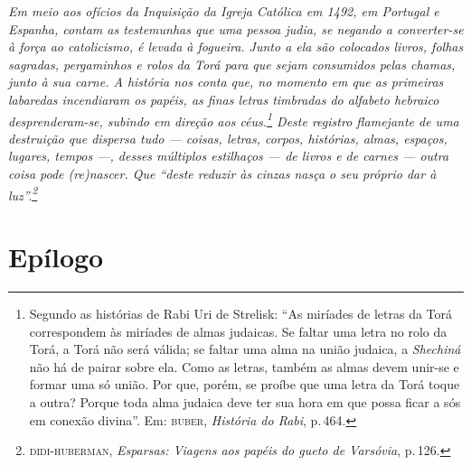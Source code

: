 \pagebreak

{
\thispagestyle{empty}

\mbox{}

\vspace{7.5cm}

\footnotesize
\noindent{}\emph{\noindent{}Em meio aos ofícios da Inquisição da Igreja Católica em 1492, em Portugal e Espanha, contam as testemunhas que uma pessoa judia, se negando a converter-se à força ao catolicismo, é levada à fogueira. Junto a ela são colocados livros, folhas sagradas, pergaminhos e rolos da Torá para que sejam consumidos pelas chamas, junto à sua carne. A história nos conta que, no momento em que as primeiras labaredas incendiaram os papéis, as finas letras timbradas do alfabeto hebraico desprenderam-se, subindo em direção aos céus.\footnote{Segundo as histórias de Rabi Uri de Strelisk: ``As miríades de letras da Torá correspondem às miríades de almas judaicas. Se faltar uma letra no rolo da Torá, a Torá não será válida; se faltar uma alma na união judaica, a \emph{Shechiná} não há de pairar sobre ela. Como as letras, também as almas devem unir-se e formar uma só união. Por que, porém, se proíbe que uma letra da Torá toque a outra? Porque toda alma judaica deve ter sua hora em que possa ficar a sós em conexão divina''. Em: \textsc{buber}, \emph{História do Rabi}, p.\,464.} Deste registro flamejante de uma destruição que dispersa tudo --- coisas, letras, corpos, histórias, almas, espaços, lugares, tempos ---, desses múltiplos estilhaços --- de livros e de carnes --- outra coisa pode (re)nascer. Que ``deste reduzir às cinzas nasça o seu próprio dar à luz''.\footnote{\textsc{didi-huberman}, \emph{Esparsas: Viagens aos papéis do gueto de Varsóvia}, p.\,126.}}
}


\pagebreak

\chapter*{Epílogo\smallskip{}}



